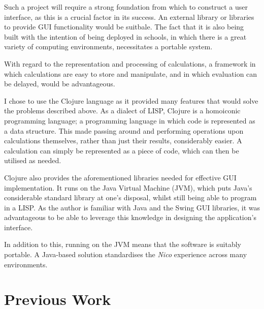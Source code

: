 \documentclass[12pt,twoside,notitlepage,xetex]{report}
\begin{document}
Such a project will require a strong foundation from which to construct a user interface, as this is a crucial factor in its success.  An external library or libraries to provide GUI functionality would be suitbale.  The fact that it is also being built with the intention of being deployed in schools, in which there is a great variety of computing environments, necessitates a portable system.

With regard to the representation and processing of calculations, a framework in which calculations are easy to store and manipulate, and in which evaluation can be delayed, would be advantageous.%

I chose to use the Clojure language as it provided many features that would solve the problems described above.  As a dialect of LISP, Clojure is a homoiconic programming language; a programming language in which code is represented as a data structure.  This made passing around and performing operations upon calculations themselves, rather than just their results, considerably easier.  A calculation can simply be represented as a piece of code, which can then be utilised as needed.

Clojure also provides the aforementioned libraries needed for effective GUI implementation.  It runs on the Java Virtual Machine (JVM), which puts Java's considerable standard library at one's disposal, whilst still being able to program in a LISP.  As the author is familiar with Java and the Swing GUI libraries, it was advantageous to be able to leverage this knowledge in designing the application's interface.

In addition to this, running on the JVM means that the software is suitably portable.  A Java-based solution standardises the \emph{Nico} experience across many environments.

\section{Previous Work}
\end{document}
